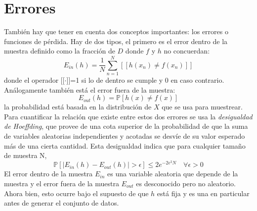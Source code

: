 \section{Errores}\label{st:errores}
También hay que tener en cuenta dos conceptos importantes: los errores o funciones de pérdida. Hay de dos tipos, el primero es el error dentro de la muestra definido como la fracción de $D$ donde $f$ y $h$ no concuerdan:
\[E_{in}(h) = \frac{1}{N}\sum_{n=1}^{N}[[h(x_{n}) \neq f(x_{n})]]\]
donde el operador [[$\cdot$]]=1 si lo de dentro se cumple y 0 en caso contrario. Análogamente también está el error fuera de la muestra:
\[ E_{out}(h)=\mathbb{P}[h(x) \neq f(x)] \]
la probabilidad está basada en la distribución de $X$ que se usa para muestrear.\\
Para cuantificar la relación que existe entre estos dos errores se usa la \textit{desigualdad de Hoeffding}, que provee de una cota superior de la probabilidad de que la suma de variables aleatorias independientes y acotadas se desvíe de su valor esperado más de una cierta cantidad. Esta desigualdad indica que para cualquier tamaño de muestra N,
\[ \mathbb{P}[\vert E_{in}(h)-E_{out}(h) \vert > \epsilon] \leq  2e^{-2\epsilon^{2}N} \quad \forall \epsilon > 0 \]
El error dentro de la muestra $E_{in}$ es una variable aleatoria que depende de la muestra y el error fuera de la muestra $E_{out}$ es desconocido pero no aleatorio. Ahora bien, esto ocurre bajo el supuesto de que $h$ está fija y es una en particular antes de generar el conjunto de datos. \cite{abu2012learning}
